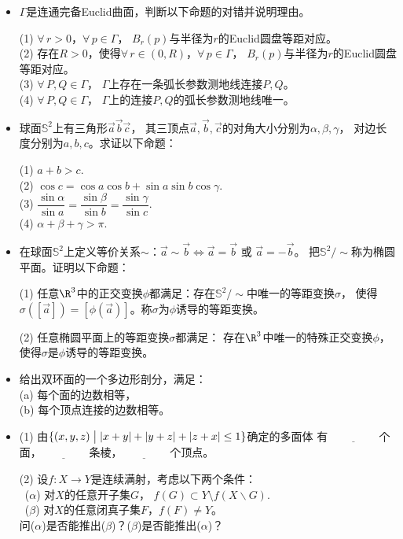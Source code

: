 \begin{itemize}
\item[一、] $\Gamma$是连通完备Euclid曲面，判断以下命题的对错并说明理由。

(1) $\forall\,r>0$，$\forall\,p\in\Gamma$，
    $B_r(p)$与半径为$r$的Euclid圆盘等距对应。\\
(2) 存在$R>0$，使得$\forall\,r\in(0,R)$，$\forall\,p\in\Gamma$，
    $B_r(p)$与半径为$r$的Euclid圆盘等距对应。\\
(3) $\forall\,P,Q\in\Gamma$，
    $\Gamma$上存在一条弧长参数测地线连接$P,Q$。\\
(4) $\forall\,P,Q\in\Gamma$，
    $\Gamma$上的连接$P,Q$的弧长参数测地线唯一。

\item[二、] 球面$\mathbb{S}^2$上有三角形$\vec{a}\vec{b}\vec{c}$，
其三顶点$\vec{a},\vec{b},\vec{c}$的对角大小分别为$\alpha,\beta,\gamma$，
对边长度分别为$a,b,c$。求证以下命题：

(1) $a+b>c$.\\
(2) $\cos c=\cos a\cos b+\sin a\sin b\cos\gamma$.\\
(3) $\dfrac{\sin\alpha}{\sin a}
=\dfrac{\sin\beta}{\sin b}=\dfrac{\sin\gamma}{\sin c}$.\\
(4) $\alpha+\beta+\gamma>\pi$.

\item[三、] 在球面$\mathbb{S}^2$上定义等价关系$\sim$：$\vec{a}\sim\vec{b}
\Leftrightarrow\vec{a}=\vec{b}\text{ 或 }\vec{a}=-\vec{b}$。
把$\mathbb{S}^2/\sim$称为椭圆平面。证明以下命题：

(1) 任意$\R^3$中的正交变换$\phi$都满足：存在$\mathbb{S}^2/\sim$中唯一的等距变换$\sigma$，
使得$\sigma([\vec{a}])=[\phi(\vec{a})]$。称$\sigma$为$\phi$诱导的等距变换。

(2) 任意椭圆平面上的等距变换$\sigma$都满足：
存在$\R^3$中唯一的特殊正交变换$\phi$，使得$\sigma$是$\phi$诱导的等距变换。

\item[四、] 给出双环面的一个多边形剖分，满足：\\
(a) 每个面的边数相等，\\
(b) 每个顶点连接的边数相等。

\item[五、] (1) 由$\{(x,y,z)\bigm||x+y|+|y+z|+|z+x|\le1\}$确定的多面体
有 $\underline{\qquad\qquad}$ 个面，$\underline{\qquad\qquad}$ 条棱，$\underline{\qquad\qquad}$ 个顶点。

(2) 设$f\colon X \to Y$是连续满射，考虑以下两个条件：\\
\quad \ ($\alpha$) 对$X$的任意开子集$G$，
$f(G) \subset Y \setminus f(X \backslash G)$.\\
\quad \ ($\beta$) 对$X$的任意闭真子集$F$，$f(F)\ne Y$。\\
问($\alpha$)是否能推出($\beta$)？($\beta$)是否能推出($\alpha$)？
\end{itemize}

